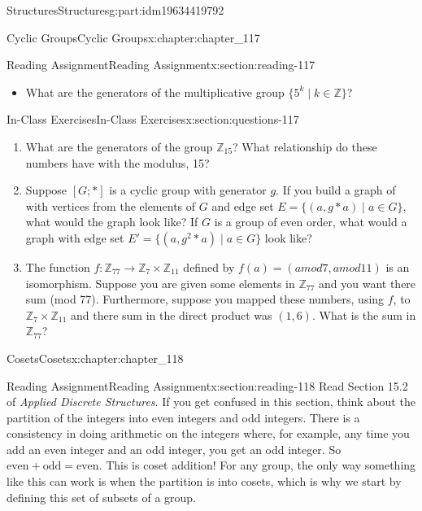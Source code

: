 \documentclass[oneside,10pt,]{book}
\numberwithin{equation}{section}
\begin{document}
\begin{partptx}{Structures}{}{Structures}{}{}{g:part:idm19634419792}
\begin{chapterptx}{Cyclic Groups}{}{Cyclic Groups}{}{}{x:chapter:chapter_117}
\begin{sectionptx}{Reading Assignment}{}{Reading Assignment}{}{}{x:section:reading-117}
\begin{itemize}[label=\textbullet]
\item{}What are the generators of the multiplicative group \(\{5^k \mid k\in \mathbb{Z}\}\)?%
\end{itemize}
%
\end{sectionptx}
%
%
\typeout{************************************************}
\typeout{************************************************}
%
\begin{sectionptx}{In-Class Exercises}{}{In-Class Exercises}{}{}{x:section:questions-117}
%
\begin{enumerate}[label=\arabic*.]
\item{}What are the generators of the group \(\mathbb{Z}_{15}\)?  What relationship do these numbers have with the modulus, 15?%
\item{}Suppose \([G;*]\) is a cyclic group with generator \(g\). If you build a graph of with vertices from the elements of \(G\) and edge set \(E= \{(a, g*a) \mid a\in G\}\), what would the graph look like?  If \(G\) is a group of even order, what would a graph with edge set \(E'= \{(a, g^2*a) \mid a\in G\}\) look like?%
\item{}The function \(f: \mathbb{Z}_{77} \rightarrow \mathbb{Z}_7\times \mathbb{Z}_{11}\) defined by \(f(a)= (a mod 7, a mod 11)\) is an isomorphism.  Suppose you are given some elements in \(\mathbb{Z}_{77}\) and you want there sum (mod 77).  Furthermore, suppose you mapped these numbers, using \(f\), to \(\mathbb{Z}_7\times \mathbb{Z}_{11}\) and there sum in the direct product was \((1,6)\).  What is the sum in \(\mathbb{Z}_{77}\)?%
\end{enumerate}
%
\end{sectionptx}
\end{chapterptx}
%
\typeout{************************************************}
\typeout{************************************************}
%
\begin{chapterptx}{Cosets}{}{Cosets}{}{}{x:chapter:chapter_118}
\index{}%
%
%
\typeout{************************************************}
\typeout{************************************************}
%
\begin{sectionptx}{Reading Assignment}{}{Reading Assignment}{}{}{x:section:reading-118}
Read Section 15.2 of \emph{Applied Discrete Structures}. If you get confused in this section, think about the partition of the integers into even integers and odd integers.  There is a consistency in doing arithmetic on the integers where, for example, any time you add an even integer and an odd integer, you get an odd integer.  So \(\textrm{even} + \textrm{odd} = \textrm{even}\).  This is coset addition!  For any group, the only way something like this can work is when the partition is into cosets, which is why we start by defining this set of subsets of a group.%

\end{sectionptx}
\end{chapterptx}
\end{partptx}
\end{document}
